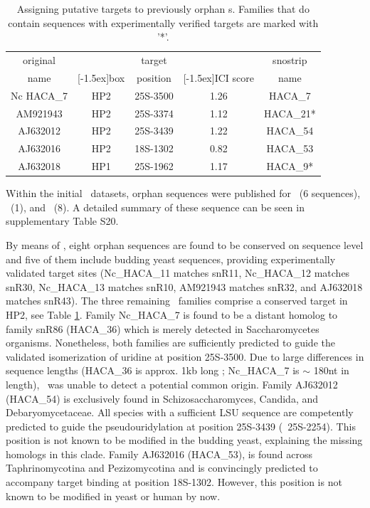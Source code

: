 \begin{table}
  \caption[Potential targets for orphan {\haca}s.]{Assigning putative 
    targets to previously
    orphan \haca s. Families that do contain sequences with
    experimentally verified targets are marked with '*'. }
  \label{tab:orphan_hacas_short}
  \begin{center}
    \begin{footnotesize}
      \begin{tabular}{c|c|c|c|c}
        original&&target&&snostrip\\
        name&\raisebox{1.5ex}[-1.5ex]{box}&position&\raisebox{1.5ex}[-1.5ex]{ICI
            score}&name\\
        \hline
        Nc HACA\_7&HP2&25S-3500&1.26&HACA\_7\\
        AM921943&HP2&25S-3374&1.12&HACA\_21*\\
        AJ632012&HP2&25S-3439&1.22&HACA\_54\\
        AJ632016&HP2&18S-1302&0.82&HACA\_53\\
        AJ632018&HP1&25S-1962&1.17&HACA\_9*\\
      \end{tabular}
    \end{footnotesize}
  \end{center}
\end{table}

Within the initial \haca\ datasets, orphan sequences were published
for \ncr\ (6 sequences), \afu\ (1), and \spo\ (8).  A detailed summary
of these sequence can be seen in supplementary Table S20.

By means of \snostrip, eight orphan sequences are found to be
conserved on sequence level and five of them include budding yeast
sequences, providing experimentally validated target sites
(Nc\_HACA\_11 matches snR11, Nc\_HACA\_12 matches snR30, Nc\_HACA\_13
matches snR10, AM921943 matches snR32, and AJ632018 matches
snR43). The three remaining \sno\ families comprise a conserved target
in HP2, see Table \ref{tab:orphan_hacas_short}. Family Nc\_HACA\_7 is
found to be a distant homolog to family snR86 (HACA\_36) which is
merely detected in Saccharomycetes organisms. Nonetheless, both
families are sufficiently predicted to guide the validated
isomerization of uridine at position 25S-3500. Due to large
differences in sequence lengths (HACA\_36 is approx. 1kb long ;
Nc\_HACA\_7 is $\sim$ 180nt in length), \snostrip\ was unable to
detect a potential common origin. Family AJ632012 (HACA\_54) is
exclusively found in Schizosaccharomyces, Candida, and
Debaryomycetaceae. All species with a sufficient LSU sequence are
competently predicted to guide the pseudouridylation at position
25S-3439 (\sce\ 25S-2254). This position is not known to be modified
in the budding yeast, explaining the missing homologs in this
clade. Family AJ632016 (HACA\_53), is found across Taphrinomycotina
and Pezizomycotina and is convincingly predicted to accompany target
binding at position 18S-1302. However, this position is not known to
be modified in yeast or human by now.

